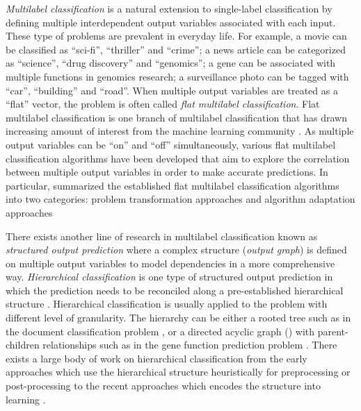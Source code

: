 \textit{Multilabel classification} is a natural extension to single-label classification by defining multiple interdependent output variables associated with each input.
These type of problems are prevalent in everyday life.
For example, a movie can be classified as ``sci-fi'', ``thriller'' and ``crime''; a news article can be categorized as ``science'', ``drug discovery'' and ``genomics''; a gene can be associated with multiple functions in genomics research; a surveillance photo can be tagged with ``car'', ``building'' and ``road''. 
When multiple output variables are treated as a ``flat'' vector, the problem is often called \textit{flat multilabel classification}.
Flat multilabel classification is one branch of multilabel classification that has drawn increasing amount of interest from the machine learning community \citep{Tsoumakas07multi,Tsoumakas10mining}.
As multiple output variables can be ``on'' and ``off'' simultaneously, various flat multilabel classification algorithms have been developed that aim to explore the correlation between multiple output variables in order to make accurate predictions.
In particular, \citet{Tsoumakas07multi} summarized the established flat multilabel classification algorithms into two categories: problem transformation approaches \citep{Zhang05a,Read09classifier,Cheng09combining} and algorithm adaptation approaches \citep{Schapire99improved,Bian12corrlog}


There exists another line of research in multilabel classification known as \textit{structured output prediction} where a complex structure (\textit{output graph}) is defined on multiple output variables to model dependencies in a more comprehensive way.
\textit{Hierarchical classification} is one type of structured output prediction in which the prediction needs to be reconciled along a pre-established hierarchical structure \citep{Silla11a}.
Hierarchical classification is usually applied to the problem with different level of granularity. 
The hierarchy can be either a rooted tree such as in the document classification problem \citep{Hao07hierarchicaly,Li07hierarchical,Rousu06}, or a directed acyclic graph (\daggraph) with parent-children relationships such as in the gene function prediction problem \citep{Barutcuoglu06hierarchical}.
There exists a large body of work on hierarchical classification from the early approaches which use the hierarchical structure heuristically for preprocessing or post-processing \citep{Koller97hierarchically,Dumais00Hierarchical,Liu05support,DeCoro07bayesian} to the recent approaches which encodes the structure into learning \citep{Cai04hierarchical,Cesabianchi05incremental,Rousu06,Gopal12bayesian}.

